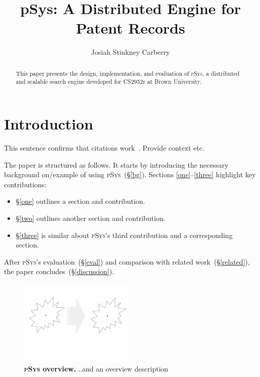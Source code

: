 \documentclass[sigplan, review, screen, 10pt]{acmart}
\title{pSys: A Distributed Engine for Patent Records}
\author{Josiah Stinkney Carberry}
\affiliation{Brown University}
\newcommand{\sx}[1]{(\S\ref{#1})}
\newcommand{\sys}{{\scshape pSys}\xspace}
\begin{document}
\begin{abstract}
This paper presents the design, implementation, and evaluation of \sys, a distributed and scalable search engine developed for CS2952r at Brown University.
\end{abstract}

\maketitle


\section{Introduction}
\label{intro}

This sentence confirms that citations work~\cite{kpn74, dryad07}. Provide
context etc.

The paper is structured as follows.
It starts by introducing the necessary background on/example of using \sys~\sx{bg}.
Sections \ref{one}--\ref{three} highlight key contributions:
\begin{itemize}
	\item
	\S\ref{one}
		outlines a section and contribution.

	\item
	\S\ref{two} outlines another section and contribution.

	\item
	\S\ref{three} is similar about \sys's third contribution and a corresponding section.

\end{itemize}

\noindent
After \sys's evaluation~\sx{eval} and  comparison with related work~\sx{related}, the paper concludes~\sx{discussion}.  

\begin{figure}[t]
\centering
\includegraphics[width=0.49\textwidth]{./figs/cs2952r.pdf}
\caption{
  \textbf{\sys overview.}
  ..and an overview description
}
\vspace{-18pt}
\label{fig:overview}
\end{figure}
\end{document}
